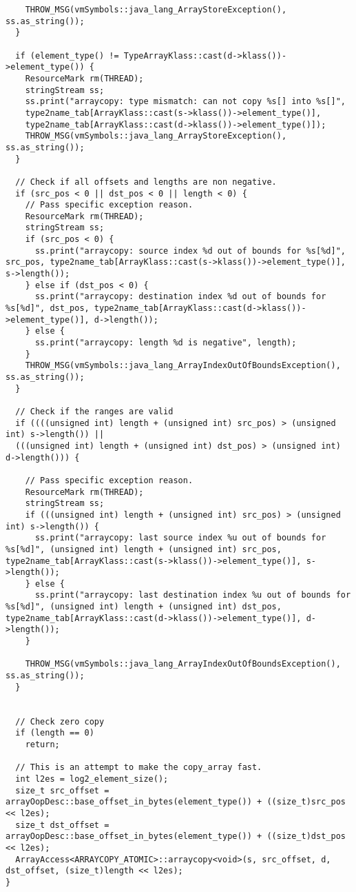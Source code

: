 \begin{itemize}
\begin{verbatim}
    THROW_MSG(vmSymbols::java_lang_ArrayStoreException(), ss.as_string());
  }

  if (element_type() != TypeArrayKlass::cast(d->klass())->element_type()) {
    ResourceMark rm(THREAD);
    stringStream ss;
    ss.print("arraycopy: type mismatch: can not copy %s[] into %s[]",
    type2name_tab[ArrayKlass::cast(s->klass())->element_type()],
    type2name_tab[ArrayKlass::cast(d->klass())->element_type()]);
    THROW_MSG(vmSymbols::java_lang_ArrayStoreException(), ss.as_string());
  }
  
  // Check if all offsets and lengths are non negative.
  if (src_pos < 0 || dst_pos < 0 || length < 0) {
    // Pass specific exception reason.
    ResourceMark rm(THREAD);
    stringStream ss;
    if (src_pos < 0) {
      ss.print("arraycopy: source index %d out of bounds for %s[%d]", src_pos, type2name_tab[ArrayKlass::cast(s->klass())->element_type()], s->length());
    } else if (dst_pos < 0) {
      ss.print("arraycopy: destination index %d out of bounds for %s[%d]", dst_pos, type2name_tab[ArrayKlass::cast(d->klass())->element_type()], d->length());
    } else {
      ss.print("arraycopy: length %d is negative", length);
    }
    THROW_MSG(vmSymbols::java_lang_ArrayIndexOutOfBoundsException(), ss.as_string());
  }
  
  // Check if the ranges are valid
  if ((((unsigned int) length + (unsigned int) src_pos) > (unsigned int) s->length()) ||
  (((unsigned int) length + (unsigned int) dst_pos) > (unsigned int) d->length())) {
    
    // Pass specific exception reason.
    ResourceMark rm(THREAD);
    stringStream ss;
    if (((unsigned int) length + (unsigned int) src_pos) > (unsigned int) s->length()) {
      ss.print("arraycopy: last source index %u out of bounds for %s[%d]", (unsigned int) length + (unsigned int) src_pos, type2name_tab[ArrayKlass::cast(s->klass())->element_type()], s->length());
    } else {
      ss.print("arraycopy: last destination index %u out of bounds for %s[%d]", (unsigned int) length + (unsigned int) dst_pos, type2name_tab[ArrayKlass::cast(d->klass())->element_type()], d->length());
    }

    THROW_MSG(vmSymbols::java_lang_ArrayIndexOutOfBoundsException(), ss.as_string());
  }
  
  
  // Check zero copy
  if (length == 0)
    return;
  
  // This is an attempt to make the copy_array fast.
  int l2es = log2_element_size();
  size_t src_offset = arrayOopDesc::base_offset_in_bytes(element_type()) + ((size_t)src_pos << l2es);
  size_t dst_offset = arrayOopDesc::base_offset_in_bytes(element_type()) + ((size_t)dst_pos << l2es);
  ArrayAccess<ARRAYCOPY_ATOMIC>::arraycopy<void>(s, src_offset, d, dst_offset, (size_t)length << l2es);
}
\end{verbatim}



\end{itemize}
